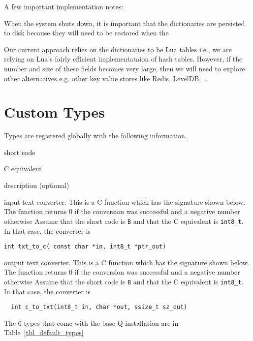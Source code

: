 \documentclass[letterpaper]{article}
\begin{document}
A few important implementation notes:
\be
\item 
When the system shuts down, it is important that the dictionaries are persisted
to disk because they will need to be restored when the 
\item Our current approach relies on the dictionaries to be Lua tables i.e., we
  are relying on Lua's fairly efficient implementataion of hash tables. However,
  if the number and size of these fields becomes very large, then we will need
  to explore other alternatives e.g. other key value stores like Redis, LevelDB,
  \ldots
  \ee

\section{Custom Types}
\label{custom_types}

Types are registered globally with the following information. 
\be
\item short code 
\item C equivalent
\item description (optional)
\item input text converter. This is a C function which has the
  signature shown below. 
The function returns 0 if the conversion was successful and a
  negative number otherwise
  Assume that the short code
  is {\tt B} and that the C equivalent is \verb+int8_t+. In that case, the
  converter is 
  \begin{verbatim}
int txt_to_c( const char *in, int8_t *ptr_out)
\end{verbatim}
\item output text converter. This is a C function which has the
  signature shown below. 
The function returns 0 if the conversion was successful and a
  negative number otherwise
  Assume that the short code
  is {\tt B} and that the C equivalent is \verb+int8_t+. In that case, the
  converter is 
  \begin{verbatim}
  int c_to_txt(int8_t in, char *out, ssize_t sz_out)
\end{verbatim}
  \ee

The 6 types that come with the base Q installation are in
Table~\ref{tbl_default_types}
\end{document}
